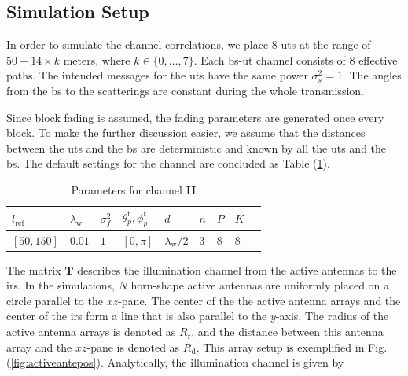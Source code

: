 \documentclass[12pt,draftclsnofoot,onecolumn,journal]{IEEEtran}
\begin{document}
\subsection{Simulation Setup}
In order to simulate the channel correlations, we place $8$ \acp{ut} at the range of $50+14\times k$ meters, where $k\in\{0,\dots, 7\}$. Each \ac{bs}-\ac{ut} channel consists of $8$ effective paths. The intended messages for the \acp{ut} have the same power $\sigma_s^2=1$. The angles from the \ac{bs} to the scatterings are constant during the whole transmission. 

Since block fading is assumed, the fading parameters are generated once every block. To make the further discussion easier, we assume that the distances between the \acp{ut} and the \ac{bs} are deterministic and known by all the \acp{ut} and the \ac{bs}.
The default settings for the channel are concluded as Table (\ref{table:parametersforthechannel}).
\begin{table}
\begin{tabularx} {1\textwidth}{ 
  | >{\centering\arraybackslash}X 
  | >{\centering\arraybackslash}X 
  | >{\centering\arraybackslash}X
  | >{\centering\arraybackslash}X 
  | >{\centering\arraybackslash}X
  | >{\centering\arraybackslash}X
  | >{\centering\arraybackslash}X
  | >{\centering\arraybackslash}X
  | >{\centering\arraybackslash}X | }
 \hline
 $l_{\mathrm{ref}}$		& $\lambda_{\mathrm{w}}$ 	& $\sigma_f^2$	& $\theta_p^{\mathrm t}, \phi_p^{\mathrm t}$	&$d$& $n$& $P$ & $K$\\
 \hline
 $[50, 150]$	& $0.01$ 			& $1$ 				&$[0, \pi]$ 					&$\lambda_{\mathrm{w}}/2$&$3$& $8$ & $8$\\
\hline
\end{tabularx}
\caption{Parameters for channel $\mathbf H$}
\label{table:parametersforthechannel}
\end{table}

The matrix $\mathbf T$ describes the illumination channel from the active antennas to the \ac{irs}.
In the simulations, $N$ horn-shape active antennas are uniformly placed on a circle parallel to the $xz$-pane. 
The center of the the active antenna arrays and the center of the \ac{irs} form a line that is also parallel to the $y$-axis.
The radius of the active antenna arrays is denoted as $R_{\mathrm r}$, and the distance between this antenna array and the $xz$-pane is denoted as $R_{\mathrm d}$. 
This array setup is exemplified in Fig. (\ref{fig:activeantepos}). Analytically, the illumination channel is given by \cite{jamali2020intelligent}
\end{document}
